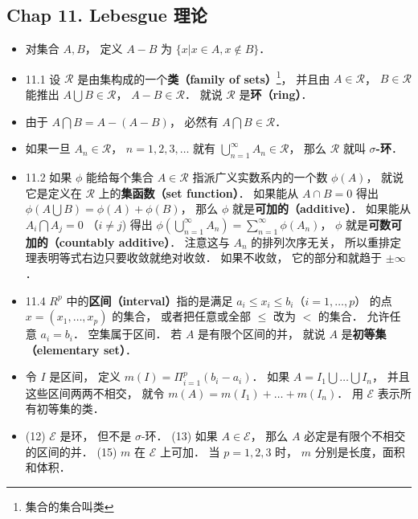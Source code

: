 \subsection{Chap 11. Lebesgue 理论}

\begin{itemize}
\item 对集合 $A, B$， 定义 $A-B$ 为 $\{x|x\in A, x\notin B\}$．

\item 11.1 设 $\mathscr R$ 是由集构成的一个\textbf{类（family of sets）}\footnote{集合的集合叫类}， 并且由 $A\in \mathscr R$， $B\in \mathscr R$ 能推出 $A\bigcup B\in \mathscr R$， $A- B\in \mathscr R$． 就说 $\mathscr R$ 是\textbf{环（ring）}．

\item 由于 $A\bigcap B=A-(A-B)$， 必然有 $A\bigcap B\in \mathscr R$．

\item 如果一旦 $A_n\in \mathscr R$， $n=1,2,3,\dots$ 就有 $\bigcup_{n=1}^\infty A_n \in \mathscr R$， 那么 $\mathscr R$ 就叫 \textbf{$\sigma$-环}．

\item 11.2 如果 $\phi$ 能给每个集合 $A\in \mathscr R$ 指派广义实数系内的一个数 $\phi(A)$， 就说它是定义在 $\mathscr R$ 上的\textbf{集函数（set function）}． 如果能从 $A\cap B=0$ 得出 $\phi(A\bigcup B)=\phi(A)+\phi(B)$， 那么 $\phi$ 就是\textbf{可加的（additive）}． 如果能从 $A_i\bigcap A_j = 0$ （$i\ne j$) 得出 $\phi(\bigcup_{n=1}^\infty A_n) = \sum_{n=1}^\infty \phi(A_n)$， $\phi$ 就是\textbf{可数可加的（countably additive）}． 注意这与 $A_n$ 的排列次序无关， 所以重排定理表明等式右边只要收敛就绝对收敛． 如果不收敛， 它的部分和就趋于 $\pm\infty$．

\item 11.4 $R^p$ 中的\textbf{区间（interval）}指的是满足 $a_i\leqslant x_i\leqslant b_i$（$i=1,\dots,p$） 的点 $x=(x_1,\dots,x_p)$ 的集合， 或者把任意或全部 $\leqslant$ 改为 $<$ 的集合． 允许任意 $a_i=b_i$． 空集属于区间． 若 $A$ 是有限个区间的并， 就说 $A$ 是\textbf{初等集（elementary set）}．

\item 令 $I$ 是区间， 定义 $m(I)=\Pi_{i=1}^p (b_i-a_i)$． 如果 $A=I_1\bigcup \dots \bigcup I_n$， 并且这些区间两两不相交， 就令 $m(A)=m(I_1)+\dots+m(I_n)$． 用 $\mathscr E$ 表示所有初等集的类．

\item (12) $\mathscr E$ 是环， 但不是 $\sigma$-环． (13) 如果 $A\in \mathscr E$， 那么 $A$ 必定是有限个不相交的区间的并． (15) $m$ 在 $\mathscr E$ 上可加． 当 $p=1,2,3$ 时， $m$ 分别是长度，面积和体积．


\end{itemize}
